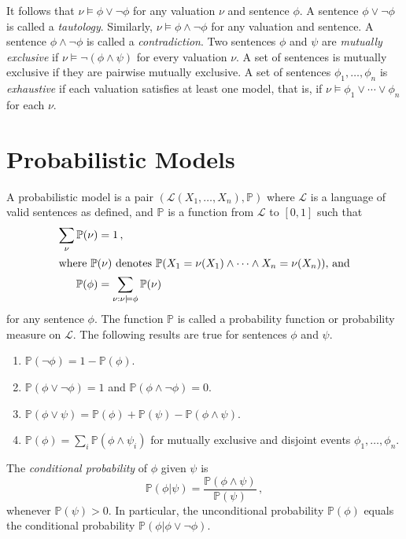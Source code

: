 \documentclass{amsart}
\newcommand{\set}[1]{\mathcal{#1}}
\newcommand{\pr}{\mathbb{P}}
\begin{document}
It follows that $\nu \models \phi \vee \neg \phi$ for any valuation
$\nu$ and sentence $\phi$. A sentence $\phi \vee \neg \phi$ is called a
\emph{tautology}. Similarly, $\nu \models \phi \wedge \neg \phi$ for any
valuation and sentence. A sentence $\phi \wedge \neg \phi$ is called a
\emph{contradiction}. Two sentences $\phi$ and $\psi$ are \emph{mutually
  exclusive} if $\nu \models \neg(\phi \wedge \psi)$ for every valuation
$\nu$. A set of sentences is mutually exclusive if they are pairwise
mutually exclusive.  A set of sentences $\phi_1,\dotsc,\phi_n$ is
\emph{exhaustive} if each valuation satisfies at least one model, that
is, if $\nu \models \phi_1 \vee \dotsb \vee \phi_n$ for each $\nu$.

\section{Probabilistic Models}

A probabilistic model is a pair $(\set{L}(X_1,\dotsc,X_n), \pr)$ where
$\set{L}$ is a language of valid sentences as defined, and $\pr$ is a
function from $\set{L}$ to $[0,1]$ such that
\begin{align} \label{probability-function}
  \sum_{\nu} \pr(\nu)  &= 1 \,,\\ \intertext{where $\pr(\nu)$ denotes
$\pr(X_1=\nu(X_1) \wedge \dotsb \wedge X_n=\nu(X_n))$, and}
  \pr(\phi) &= \sum_{\nu: \nu \models \phi} \pr(\nu) 
\end{align}
for any sentence $\phi$. The function $\pr$ is called a probability
function or probability measure on $\set{L}$. The following results are
true for sentences $\phi$ and $\psi$.
\begin{enumerate} 
\item $\pr(\neg \phi) = 1- \pr(\phi)$.
\item $\pr(\phi \vee \neg \phi) = 1$ and $\pr(\phi \wedge \neg \phi)=0$.
\item $\pr(\phi \vee \psi)=\pr(\phi)+\pr(\psi)-\pr(\phi \wedge \psi)$.
\item $\pr(\phi)=\sum_i \pr(\phi \wedge \psi_i)$ for mutually exclusive and disjoint events $\phi_1,\dotsc,\phi_n$.
\end{enumerate}

The \emph{conditional probability} of $\phi$ given $\psi$ is
\begin{equation} \label{conditional-probability}
\pr(\phi|\psi) = \frac{\pr(\phi \wedge \psi)}{\pr(\psi)} \, ,
\end{equation}
whenever $\pr(\psi)>0$.  In particular, the unconditional probability
$\pr(\phi)$ equals the conditional probability
$\pr(\phi|\phi \vee \neg \phi)$.
\end{document}
